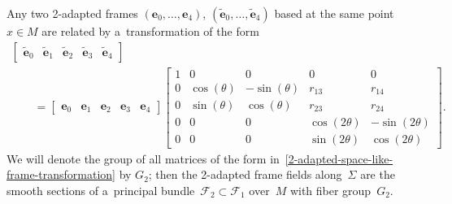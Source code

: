 \documentclass[10pt,a4paper]{amsart}
\numberwithin{equation}{section}
\theoremstyle{definition}
\begin{document}
Any two 2-adapted frames $(\mathbf{e}_0, \ldots, \mathbf{e}_4)$, $(\tilde{\mathbf{e}}_0, \ldots, \tilde{\mathbf{e}}_4)$
based at the same point $x \in M$ are related by a~transformation of the form
\begin{gather}
\begin{bmatrix}
\tilde{\mathbf{e}}_0 & \tilde{\mathbf{e}}_1 & \tilde{\mathbf{e}}_2 & \tilde{\mathbf{e}}_3 & \tilde{\mathbf{e}}_4
\end{bmatrix}
\nonumber
\\
\qquad{}
=
\begin{bmatrix}
\mathbf{e}_0 & \mathbf{e}_1 & \mathbf{e}_2 & \mathbf{e}_3 & \mathbf{e}_4
\end{bmatrix}
\begin{bmatrix}
1 & 0 & 0 & 0 & 0
\\
0 & \cos(\theta) & -\sin(\theta) & r_{13} & r_{14}
\\
0 & \sin(\theta) & \cos(\theta) & r_{23} & r_{24}
\\
0 & 0 & 0 & \cos(2\theta) & -\sin(2\theta)
\\
0 & 0 & 0 & \sin(2\theta) & \cos(2\theta)
\end{bmatrix}.
\label{2-adapted-space-like-frame-transformation}
\end{gather}
We will denote the group of all matrices of the form in~\eqref{2-adapted-space-like-frame-transformation} by $G_2$; then
the 2-adapted frame f\/ields along~$\Sigma$ are the smooth sections of a~principal bundle~$\mathcal{F}_2 \subset
\mathcal{F}_1$ over~$M$ with f\/iber group~$G_2$.
\end{document}

